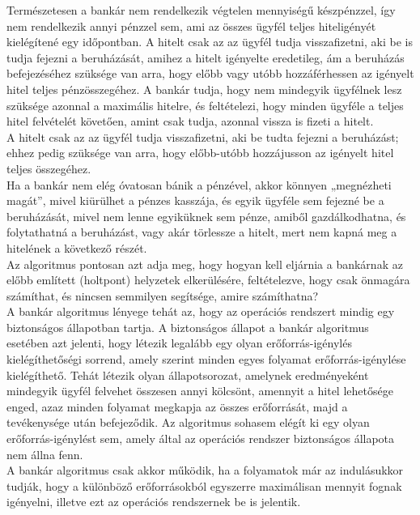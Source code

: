 \documentclass[tikz,12pt,margin=0px]{article}
\begin{document}
    \noindent Természetesen a bankár nem rendelkezik végtelen mennyiségű készpénzzel, így nem rendelkezik annyi pénzzel sem, ami az összes ügyfél teljes hiteligényét kielégítené egy időpontban. A hitelt csak az az ügyfél tudja visszafizetni, aki be is tudja fejezni a beruházását, amihez a hitelt igényelte eredetileg, ám a beruházás befejezéséhez szüksége van arra, hogy előbb vagy utóbb hozzáférhessen az igényelt hitel teljes pénzösszegéhez. A bankár tudja, hogy nem mindegyik ügyfélnek lesz szüksége azonnal a maximális hitelre, és feltételezi, hogy minden ügyféle a teljes hitel felvételét követően, amint csak tudja, azonnal vissza is fizeti a hitelt.\\

    \noindent A hitelt csak az az ügyfél tudja visszafizetni, aki be tudta fejezni a beruházást; ehhez pedig szüksége van arra, hogy előbb-utóbb hozzájusson az igényelt hitel teljes összegéhez.\\

    \noindent Ha a bankár nem elég óvatosan bánik a pénzével, akkor könnyen „megnézheti magát”, mivel kiürülhet a pénzes kasszája, és egyik ügyféle sem fejezné be a beruházását, mivel nem lenne egyiküknek sem pénze, amiből gazdálkodhatna, és folytathatná a beruházást, vagy akár törlessze a hitelt, mert nem kapná meg a hitelének a következő részét.\\

    \noindent Az algoritmus pontosan azt adja meg, hogy hogyan kell eljárnia a bankárnak az előbb említett (holtpont) helyzetek elkerülésére, feltételezve, hogy csak önmagára számíthat, és nincsen semmilyen segítsége, amire számíthatna?\\
\newpage
    \noindent A bankár algoritmus lényege tehát az, hogy az operációs rendszert mindig egy biztonságos állapotban tartja. A biztonságos állapot a bankár algoritmus esetében azt jelenti, hogy létezik legalább egy olyan erőforrás-igénylés kielégíthetőségi sorrend, amely szerint minden egyes folyamat erőforrás-igénylése kielégíthető. Tehát létezik olyan állapotsorozat, amelynek eredményeként mindegyik ügyfél felvehet összesen annyi kölcsönt, amennyit a hitel lehetősége enged, azaz minden folyamat megkapja az összes erőforrását, majd a tevékenysége után befejeződik. Az algoritmus sohasem elégít ki egy olyan erőforrás-igénylést sem, amely által az operációs rendszer biztonságos állapota nem állna fenn.\\

    \noindent A bankár algoritmus csak akkor működik, ha a folyamatok már az indulásukkor tudják, hogy a különböző erőforrásokból egyszerre maximálisan mennyit fognak igényelni, illetve ezt az operációs rendszernek be is jelentik.\\
\end{document}
